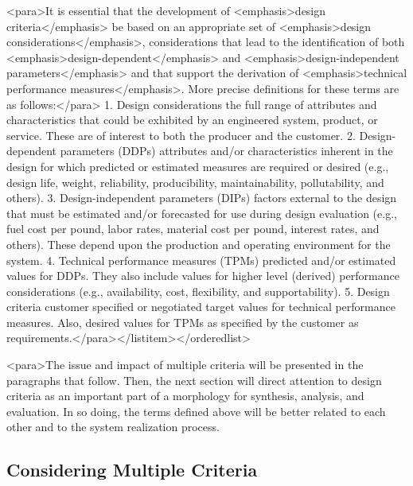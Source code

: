 <para>It is essential that the development of <emphasis>design criteria</emphasis> be based on an appropriate set of <emphasis>design considerations</emphasis>, considerations that lead to the identification of both <emphasis>design-dependent</emphasis> and <emphasis>design-independent parameters</emphasis> and that support the derivation of <emphasis>technical performance measures</emphasis>. More precise definitions for these terms are as follows:</para>
1.	Design considerations the full range of attributes and characteristics that could be exhibited by an engineered system, product, or service. These are of interest to both the producer and the customer.
2.	Design-dependent parameters (DDPs) attributes and/or characteristics inherent in the design for which predicted or estimated measures are required or desired (e.g., design life, weight, reliability, producibility, maintainability, pollutability, and others).
3.	Design-independent parameters (DIPs) factors external to the design that must be estimated and/or forecasted for use during design evaluation (e.g., fuel cost per pound, labor rates, material cost per pound, interest rates, and others). These depend upon the production and operating environment for the system.
4.	Technical performance measures (TPMs) predicted and/or estimated values for DDPs. They also include values for higher level (derived) performance considerations (e.g., availability, cost, flexibility, and supportability).
5.	Design criteria customer specified or negotiated target values for technical performance measures. Also, desired values for TPMs as specified by the customer as requirements.</para></listitem></orderedlist>

<para>The issue and impact of multiple criteria will be presented in the paragraphs that follow. Then, the next section will direct attention to design criteria as an important part of a morphology for synthesis, analysis, and evaluation. In so doing, the terms defined above will be better related to each other and to the system realization process.

\subsection{Considering Multiple Criteria}

